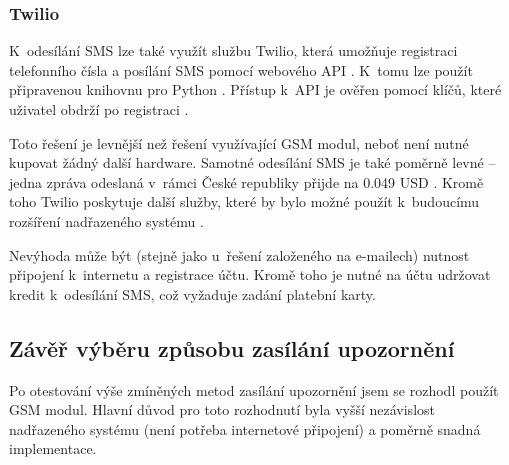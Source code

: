 \subsubsection{Twilio}

K~odesílání SMS lze také využít službu Twilio, která umožňuje registraci telefonního čísla a posílání SMS pomocí webového API \cite{twilio_sms}. K~tomu lze použít připravenou knihovnu pro Python \cite{twilio_python}. Přístup k~API je ověřen pomocí klíčů, které uživatel obdrží po registraci \cite{twilio_keys}.

Toto řešení je levnější než řešení využívající GSM modul, neboť není nutné kupovat žádný další hardware. Samotné odesílání SMS je také poměrně levné -- jedna zpráva odeslaná v~rámci České republiky přijde na 0.049 USD \cite{twilio_pricing}. Kromě toho Twilio poskytuje další služby, které by bylo možné použít k~budoucímu rozšíření nadřazeného systému \cite{twilio_products}.

Nevýhoda může být (stejně jako u~řešení založeného na e-mailech) nutnost připojení k~internetu a registrace účtu. Kromě toho je nutné na účtu udržovat kredit k~odesílání SMS, což vyžaduje zadání platební karty.





\subsection{Závěř výběru způsobu zasílání upozornění}

Po otestování výše zmíněných metod zasílání upozornění jsem se rozhodl použít GSM modul. Hlavní důvod pro toto rozhodnutí byla vyšší nezávislost nadřazeného systému (není potřeba internetové připojení) a poměrně snadná implementace. 

